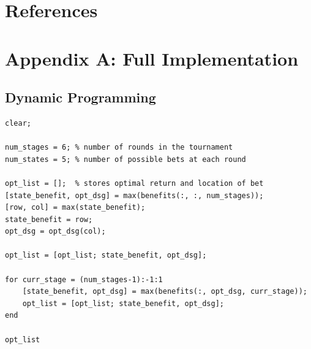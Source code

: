 \documentclass[12pt]{article}
\begin{document}
\newpage
\section{References}



\newpage
\section{Appendix A: Full Implementation}
\subsection{Dynamic Programming}
\begin{verbatim}
clear;

num_stages = 6;	% number of rounds in the tournament
num_states = 5;	% number of possible bets at each round

opt_list = [];	% stores optimal return and location of bet
[state_benefit, opt_dsg] = max(benefits(:, :, num_stages));
[row, col] = max(state_benefit);
state_benefit = row;
opt_dsg = opt_dsg(col);

opt_list = [opt_list; state_benefit, opt_dsg];

for curr_stage = (num_stages-1):-1:1
	[state_benefit, opt_dsg] = max(benefits(:, opt_dsg, curr_stage));
	opt_list = [opt_list; state_benefit, opt_dsg];
end

opt_list
\end{verbatim}

\begingroup
    \fontsize{8pt}{10pt}
    \lstset{breaklines=true}
	
\end{document}
